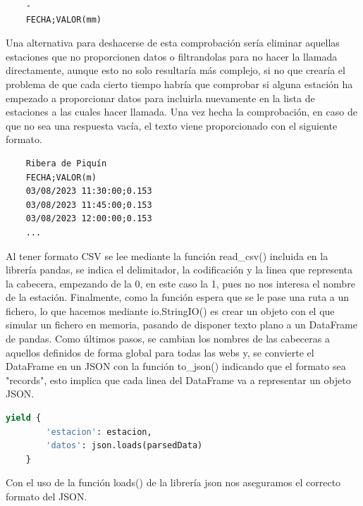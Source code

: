 \begin{verbatim}
	-
	FECHA;VALOR(mm)
\end{verbatim}

Una alternativa para deshacerse de esta comprobación sería eliminar aquellas estaciones que no proporcionen datos o filtrandolas para no hacer la llamada directamente, aunque esto no solo resultaría más complejo, si no que crearía el problema de que cada cierto tiempo habría que comprobar si alguna estación ha empezado a proporcionar datos para incluirla nuevamente en la lista de estaciones a las cuales hacer llamada.\newline
\newline
Una vez hecha la comprobación, en caso de que no sea una respuesta vacía, el texto viene proporcionado con el siguiente formato.

\begin{verbatim}
	Ribera de Piquín
	FECHA;VALOR(m)
	03/08/2023 11:30:00;0.153
	03/08/2023 11:45:00;0.153
	03/08/2023 12:00:00;0.153
	...
\end{verbatim}

Al tener formato CSV se lee mediante la función read\_csv() incluida en la librería pandas, se indica el delimitador, la codificación y la linea que representa la cabecera, empezando de la 0, en este caso la 1, pues no nos interesa el nombre de la estación. Finalmente, como la función espera que se le pase una ruta a un fichero, lo que hacemos mediante io.StringIO() es crear un objeto con el que simular un fichero en memoria, pasando de disponer texto plano a un DataFrame de pandas.\newline
\newline
Como últimos pasos, se cambian los nombres de las cabeceras a aquellos definidos de forma global para todas las webs y, se convierte el DataFrame en un JSON con la función to\_json() indicando que el formato sea "records", esto implica que cada linea del DataFrame va a representar un objeto JSON.

\begin{lstlisting}[language=Python, caption={Guardado de datos de CHCantábrico Nivel Spider}]
	yield {
		'estacion': estacion,
		'datos': json.loads(parsedData)
	}
\end{lstlisting}

Con el uso de la función loads() de la librería json nos aseguramos el correcto formato del JSON.

